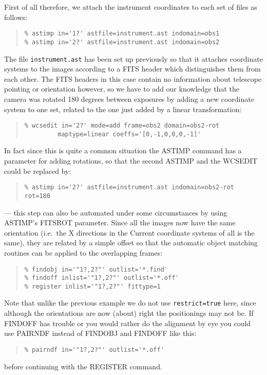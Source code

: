 \documentclass[twoside,11pt]{article}
\newcommand{\htmlref}[2]{#1}
\renewcommand{\_}{\texttt{\symbol{95}}}
\newenvironment{myquote}{\begin{quote}\begin{small}}{\end{small}\end{quote}}
\newcommand{\text}[1]{{\small \tt #1}}
\newcommand{\routine}[1]{{\sc #1}}
\newcommand{\xroutine}[1]{\htmlref{{\sc #1}}{#1}}
\begin{document}
First of all therefore, we attach the instrument coordinates
to each set of files as follows:
\begin{myquote}
\begin{verbatim}
% astimp in='1?' astfile=instrument.ast indomain=obs1 
% astimp in='2?' astfile=instrument.ast indomain=obs2
\end{verbatim}
\end{myquote}
The file \text{instrument.ast} has been set up previously so that
it attaches coordinate systems to the images according to 
a FITS header which distinguishes them from each other.
The FITS headers in this case contain no information about 
telescope pointing or orientation however, so we have to add
our knowledge that the camera was rotated 180 degrees between
exposures by adding a new coordinate system to one set, 
related to the one just added by a linear transformation:
\begin{myquote}
\begin{verbatim}
% wcsedit in='2?' mode=add frame=obs2 domain=obs2-rot 
         maptype=linear coeffs='[0,-1,0,0,0,-1]'
\end{verbatim}
\end{myquote}
In fact since this is quite a common situation the \xroutine{ASTIMP}
command has a parameter for adding rotations, so that the second
ASTIMP and the WCSEDIT could be replaced by:
\begin{myquote}
\begin{verbatim}
% astimp in='2?' astfile=instrument.ast indomain=obs2-rot rot=180
\end{verbatim}
\end{myquote}
--- this step can also be automated under some circumstances by using 
\routine{ASTIMP}'s FITSROT parameter.
Since all the images now have the same orientation 
(i.e.\ the X directions in the Current coordinate systems of all is the same), 
they are related
by a simple offset so that the automatic object matching routines
can be applied to the overlapping frames:
\begin{myquote}
\begin{verbatim}
% findobj in='"1?,2?"' outlist='*.find'
% findoff inlist='"1?,2?"' outlist='*.off'
% register inlist='"1?,2?"' fittype=1
\end{verbatim}
\end{myquote}
Note that unlike the previous example we do not use {\tt restrict=true} here,
since although the orientations are now (about) right 
the positionings may not be.
If \routine{FINDOFF} has trouble or you would rather do the alignment
by eye you could use \xroutine{PAIRNDF} instead of 
\routine{FINDOBJ} and \routine{FINDOFF} like this:
\begin{myquote}
\begin{verbatim}
% pairndf in='"1?,2?"' outlist='*.off'
\end{verbatim}
\end{myquote}
before continuing with the \routine{REGISTER} command.
\end{document}
